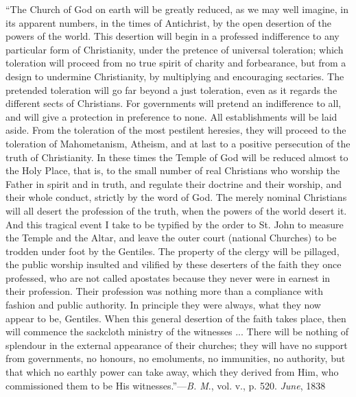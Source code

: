 ``The Church of God on earth will be greatly reduced, as we may
well imagine, in its apparent numbers, in the times of Antichrist, by
the open desertion of the powers of the world. This desertion will
begin in a professed indifference to any particular form of
Christianity, under the pretence of universal toleration; which
toleration will proceed from no true spirit of charity and
forbearance, but from a design to undermine Christianity, by
multiplying and encouraging sectaries. The pretended toleration will
go far beyond a just toleration, even as it regards the different
sects of Christians. For governments will pretend an indifference to
all, and will give a protection in preference to none. All
establishments will be laid aside. From the toleration of the most
pestilent heresies, they will proceed to the toleration of
Mahometanism, Atheism, and at last to a positive persecution of the
truth of Christianity. In these times the Temple of God will be
reduced almost to the Holy Place, that is, to the small number of real
Christians who worship the Father in spirit and in truth, and regulate
their doctrine and their worship, and their whole conduct, strictly by
the word of God. The merely nominal Christians will all desert
the profession of the truth, when the powers of the world desert it.
And this tragical event I take to be typified by the order to St. John
to measure the Temple and the Altar, and leave the outer court
(national Churches) to be trodden under foot by the Gentiles. The
property of the clergy will be pillaged, the public worship insulted
and vilified by these deserters of the faith they once professed, who
are not called apostates because they never were in earnest in their
profession. Their profession was nothing more than a compliance with
fashion and public authority. In principle they were always, what they
now appear to be, Gentiles. When this general desertion of the faith
takes place, then will commence the sackcloth ministry of the
witnesses ... There will be nothing of splendour in the external
appearance of their churches; they will have no support from
governments, no honours, no emoluments, no immunities, no authority,
but that which no earthly power can take away, which they derived from
Him, who commissioned them to be His witnesses.''—\emph{B. M}.,
vol. v., p. 520.
\emph{June}, 1838




